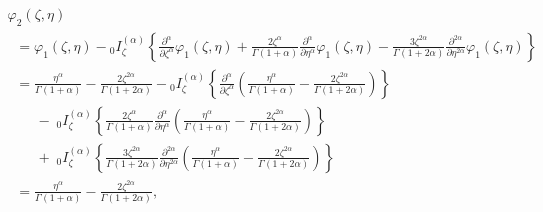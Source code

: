 \documentclass[10pt]{NSP1}
\begin{document}
\begin{equation}
\label{eq33}
\begin{array}{lllll}
\varphi _2 \left( {\zeta ,\eta } \right) \\
 \;\;=\varphi _1 \left( {\zeta ,\eta } \right)-{ }_0I_\zeta ^{\left( \alpha
\right)}\left\{ {\frac{\partial ^\alpha }{\partial \zeta ^\alpha }\varphi _1
\left( {\zeta ,\eta } \right)+\frac{2\zeta ^\alpha }{\Gamma \left( {1+\alpha
} \right)}\frac{\partial ^\alpha }{\partial \eta ^\alpha }\varphi _1 \left(
{\zeta ,\eta } \right)-\frac{3\zeta ^{2\alpha }}{\Gamma \left( {1+2\alpha }
\right)}\frac{\partial ^{2\alpha }}{\partial \eta ^{2\alpha }}\varphi _1
\left( {\zeta ,\eta } \right)} \right\} \\
 \;\; =\frac{\eta ^\alpha }{\Gamma \left( {1+\alpha } \right)}-\frac{2\zeta
^{2\alpha }}{\Gamma \left( {1+2\alpha } \right)}-{ }_0I_\zeta ^{\left(
\alpha \right)}\left\{ {\frac{\partial ^\alpha }{\partial \zeta ^\alpha
}\left( {\frac{\eta ^\alpha }{\Gamma \left( {1+\alpha }
\right)}-\frac{2\zeta ^{2\alpha }}{\Gamma \left( {1+2\alpha } \right)}}
\right)} \right\} \\
\qquad -\;_0I_\zeta ^{\left( \alpha \right)}\left\{ {\frac{2\zeta ^\alpha }{\Gamma
\left( {1+\alpha } \right)}\frac{\partial ^\alpha }{\partial \eta ^\alpha
}\left( {\frac{\eta ^\alpha }{\Gamma \left( {1+\alpha }
\right)}-\frac{2\zeta ^{2\alpha }}{\Gamma \left( {1+2\alpha } \right)}}
\right)} \right\} \\
\qquad +\;_0I_\zeta ^{\left( \alpha \right)}\left\{ {\frac{3\zeta ^{2\alpha
}}{\Gamma \left( {1+2\alpha } \right)}\frac{\partial ^{2\alpha }}{\partial
\eta ^{2\alpha }}\left( {\frac{\eta ^\alpha }{\Gamma \left( {1+\alpha }
\right)}-\frac{2\zeta ^{2\alpha }}{\Gamma \left( {1+2\alpha } \right)}}
\right)} \right\} \\
\;\; =\frac{\eta ^\alpha }{\Gamma \left( {1+\alpha } \right)}-\frac{2\zeta
^{2\alpha }}{\Gamma \left( {1+2\alpha } \right)},
 \end{array}
\end{equation}
\end{document}
